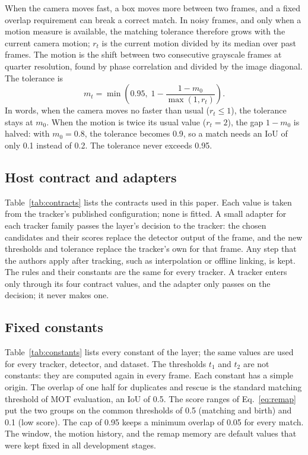 When the camera moves fast, a box moves more between two frames, and a fixed
overlap requirement can break a correct match. In noisy frames, and only when
a motion measure is available, the matching tolerance therefore grows with
the current camera motion; $r_t$ is the current motion divided by its median
over past frames. The motion is the shift between two consecutive grayscale
frames at quarter resolution, found by phase correlation
\cite{reddy1996phasecorr} and divided by the image diagonal. The tolerance is
\begin{equation}
m_t=\min\!\left(0.95,\;1-\frac{1-m_0}{\max(1,r_t)}\right).
\label{eq:motion}
\end{equation}
In words, when the camera moves no faster than usual ($r_t\le1$), the
tolerance stays at $m_0$. When the motion is twice its usual value
($r_t=2$), the gap $1-m_0$ is halved: with $m_0=0.8$, the tolerance becomes
0.9, so a match needs an IoU of only 0.1 instead of 0.2. The tolerance never
exceeds 0.95.

\subsection{Host contract and adapters}\label{sec:contract}
Table~\ref{tab:contracts} lists the contracts used in this paper. Each value
is taken from the tracker's published configuration; none is fitted. A small
adapter for each tracker family passes the layer's decision to the tracker:
the chosen candidates and their scores replace the detector output of the
frame, and the new thresholds and tolerance replace the tracker's own for
that frame. Any step that the authors apply after tracking, such as
interpolation or offline linking, is kept. The rules and their constants are
the same for every tracker. A tracker enters only through its four contract
values, and the adapter only passes on the decision; it never makes one.



\subsection{Fixed constants}\label{sec:constants}
Table~\ref{tab:constants} lists every constant of the layer; the same values
are used for every tracker, detector, and dataset. The thresholds $t_1$ and
$t_2$ are not constants: they are computed again in every frame. Each
constant has a simple origin. The overlap of one half for duplicates and
rescue is the standard matching threshold of MOT evaluation, an IoU of 0.5. The score ranges of Eq.~\eqref{eq:remap} put the two
groups on the common thresholds of 0.5 (matching and birth) and 0.1 (low
score). The cap of 0.95 keeps a minimum overlap of 0.05 for every match. The
window, the motion history, and the remap memory are default values that were
kept fixed in all development stages.

